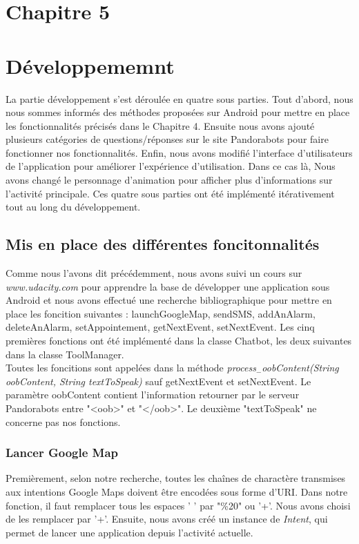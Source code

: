 \section*{Chapitre 5}
\section{Développememnt}
	La partie développement s'est déroulée en quatre sous parties. Tout d'abord, nous nous sommes informés des méthodes proposées sur Android pour mettre en place les fonctionnalités précisés dans le Chapitre 4. Ensuite nous avons ajouté plusieurs catégories de questions/réponses sur le site Pandorabots pour faire fonctionner nos fonctionnalités. Enfin, nous avons modifié l'interface d'utilisateurs de l'application pour améliorer l'expérience d'utilisation. Dans ce cas là, Nous avons changé le personnage d'animation pour afficher plus d'informations sur l'activité principale. Ces quatre sous parties ont été implémenté itérativement tout au long du développement.\\

\subsection{Mis en place des différentes foncitonnalités}
	
\indent Comme nous l'avons dit précédemment, nous avons suivi un cours sur \emph{www.udacity.com} pour apprendre la base de développer une application sous Android et nous avons effectué une recherche bibliographique pour mettre en place les foncition suivantes : launchGoogleMap, sendSMS, addAnAlarm, deleteAnAlarm, setAppointement, getNextEvent, setNextEvent. Les cinq premières fonctions ont été implémenté dans la classe Chatbot, les deux suivantes dans la classe ToolManager.\\
\indent Toutes les foncitions sont appelées dans la méthode \emph{process$_-$oobContent(String oobContent, String textToSpeak)} sauf getNextEvent et setNextEvent. Le paramètre oobContent contient l'information retourner par le serveur Pandorabots entre "<oob>" et "</oob>". Le deuxième "textToSpeak" ne concerne pas nos fonctions.\\

\subsubsection{Lancer Google Map}

\indent Premièrement, selon notre recherche, toutes les chaînes de charactère transmises aux intentions Google Maps doivent être encodées sous forme d'URI. Dans notre fonction, il faut remplacer tous les espaces ' ' par "\%20" ou '+'. Nous avons choisi de les remplacer par '+'. Ensuite, nous avons créé un instance de \emph{Intent}, qui permet de lancer une application depuis l'activité actuelle. \\

